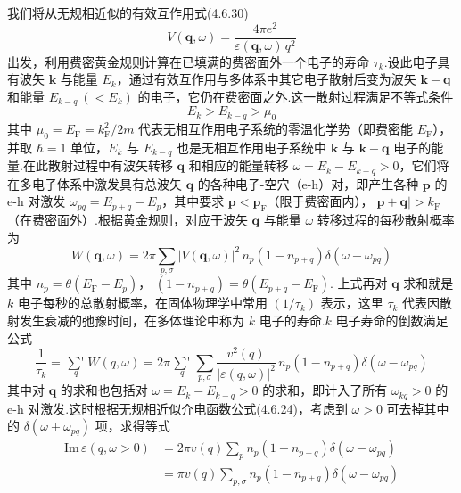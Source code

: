 我们将从无规相近似的有效互作用式(4.6.30)
\begin{equation*}
  V(\boldsymbol{q},\omega)=\frac{4\pi e^{2}}{\varepsilon(\boldsymbol{q},\omega)\,q^{2}}
\end{equation*}
出发，利用费密黄金规则计算在已填满的费密面外一个电子的寿命 $\tau_{k}$.设此电子具有波矢 $\boldsymbol{k}$ 与能量 $E_{k}$，通过有效互作用与多体系中其它电子散射后变为波矢 $\boldsymbol{k}-\boldsymbol{q}$ 和能量 $E_{k-q}\ (<E_{k})$ 的电子，它仍在费密面之外.这一散射过程满足不等式条件
\begin{equation}
  E_{k}>E_{k-q}>\mu_{0}
\end{equation}
其中 $\mu_{0}=E_{\mathrm{F}}=k_{\mathrm{F}}^{2}/2m$ 代表无相互作用电子系统的零温化学势（即费密能 $E_{\mathrm{F}}$），并取 $\hbar=1$ 单位，$E_{k}$ 与 $E_{k-q}$ 也是无相互作用电子系统中 $\boldsymbol{k}$ 与 $\boldsymbol{k}-\boldsymbol{q}$ 电子的能量.在此散射过程中有波矢转移 $\boldsymbol{q}$ 和相应的能量转移 $\omega=E_{k}-E_{k-q}>0$，它们将在多电子体系中激发具有总波矢 $\boldsymbol{q}$ 的各种电子-空穴（e-h）对，即产生各种 $\boldsymbol{p}$ 的 e-h 对激发 $\omega_{pq}=E_{p+q}-E_{p}$，其中要求 $\boldsymbol{p}<\boldsymbol{p}_{\mathrm{F}}$（限于费密面内），$|\boldsymbol{p}+\boldsymbol{q}|>k_{\mathrm{F}}$（在费密面外）.根据黄金规则，对应于波矢 $\boldsymbol{q}$ 与能量 $\omega$ 转移过程的每秒散射概率为
\begin{equation}
  W(\boldsymbol{q},\omega)=2\pi\sum_{p,\sigma}
  |V(\boldsymbol{q},\omega)|^{2}\,n_{p}\left(1-n_{p+q}\right)
  \delta\left(\omega-\omega_{pq}\right)
\end{equation}
其中 $n_{p}=\theta\left(E_{\mathrm{F}}-E_{p}\right)$，
$\left(1-n_{p+q}\right)=\theta\left(E_{p+q}-E_{\mathrm{F}}\right)$. 上式再对 $\boldsymbol{q}$ 求和就是 $k$ 电子每秒的总散射概率，在固体物理学中常用 $\left(1/\tau_{k}\right)$ 表示，这里 $\tau_{k}$ 代表因散射发生衰减的弛豫时间，在多体理论中称为 $k$ 电子的寿命.$k$ 电子寿命的倒数满足公式
\begin{equation}
  \frac{1}{\tau_{k}}=\mathop{{\sum}'}\limits_{q}W(q,\omega)
  =2\pi\mathop{{\sum}'}\limits_{q}\sum_{p,\sigma}
  \frac{v^{2}(q)}{|\varepsilon(q,\omega)|^{2}}\,
  n_{p}\left(1-n_{p+q}\right)\delta\left(\omega-\omega_{pq}\right)
\end{equation}
其中对 $\boldsymbol{q}$ 的求和也包括对 $\omega=E_{k}-E_{k-q}>0$ 的求和，即计入了所有 $\omega_{kq}>0$ 的 e-h 对激发.这时根据无规相近似介电函数公式(4.6.24)，考虑到 $\omega>0$ 可去掉其中的 $\delta\left(\omega+\omega_{pq}\right)$ 项，求得等式
\begin{equation}
\begin{aligned}
  \mathrm{Im}\,\varepsilon(q,\omega>0)
  &=2\pi v(q)\sum_{p}n_{p}\left(1-n_{p+q}\right)
  \delta\left(\omega-\omega_{pq}\right)\\
  &=\pi v(q)\sum_{p,\sigma}n_{p}\left(1-n_{p+q}\right)
  \delta\left(\omega-\omega_{pq}\right)
\end{aligned}
\end{equation}

